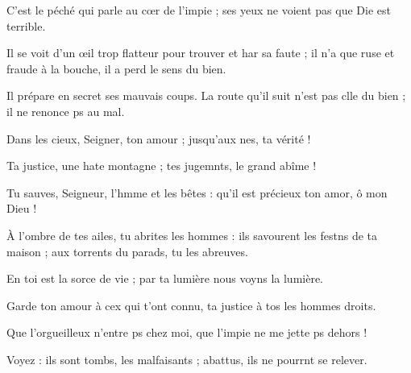 \item C’est le péché qui parle au cœr de l’impie ;\psstar{} ses yeux ne voient pas que Die est terrible.
\item Il se voit d’un œil trop flatteur pour trouver et har sa faute ;\psstar{} il n’a que ruse et fraude à la bouche, il a perd le sens du bien.
\item Il prépare en secret ses mauvais coups.\pscross{} La route qu’il suit n’est pas clle du bien ;\psstar{} il ne renonce ps au mal.
\item Dans les cieux, Seigner, ton amour ;\psstar{} jusqu’aux nes, ta vérité !
\item Ta justice, une hate montagne ;\psstar{} tes jugemnts, le grand abîme !
\item Tu sauves, Seigneur, l’hmme et les bêtes :\psstar{} qu’il est précieux ton amor, ô mon Dieu !
\item À l’ombre de tes ailes, tu abrites les hommes :\pscross{} ils savourent les festns de ta maison ;\psstar{} aux torrents du parads, tu les abreuves.
\item En toi est la sorce de vie ;\psstar{} par ta lumière nous voyns la lumière.
\item Garde ton amour à cex qui t’ont connu,\psstar{} ta justice à tos les hommes droits.
\item Que l’orgueilleux n’entre ps chez moi,\psstar{} que l’impie ne me jette ps dehors !
\item Voyez : ils sont tombs, les malfaisants ;\psstar{} abattus, ils ne pourrnt se relever.